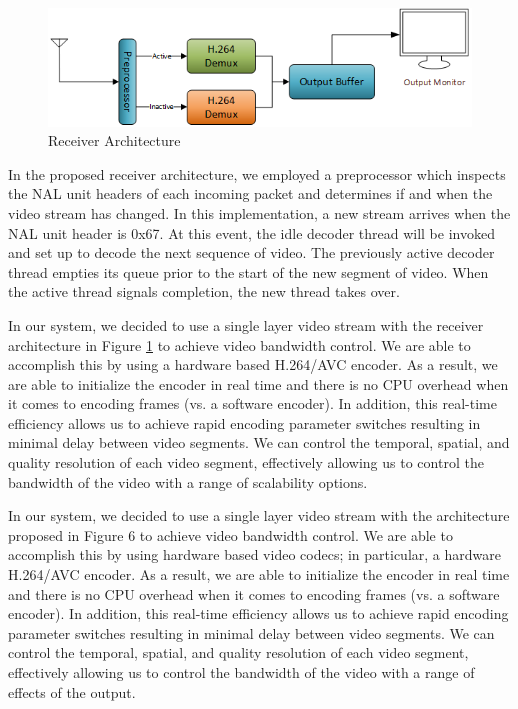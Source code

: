 \documentclass[a4paper,12pt]{article}
\begin{document}
\begin{figure}[h]
\centering
\includegraphics[width=0.8\linewidth]{ReceiverArchitecture.png}
\caption{Receiver Architecture}
\label{fig:ReceiverArchitecture}
\end{figure}
In the proposed receiver architecture, we employed a preprocessor which inspects the NAL unit headers of each incoming packet and determines if and when the video stream has changed. In this implementation, a new stream arrives when the NAL unit header is 0x67. At this event, the idle decoder thread will be invoked and set up to decode the next sequence of video. The previously active decoder thread empties its queue prior to the start of the new segment of video. When the active thread signals completion, the new thread takes over.

In our system, we decided to use a single layer video stream with the receiver architecture in Figure \ref{fig:ReceiverArchitecture} to achieve video bandwidth control. We are able to accomplish this by using a hardware based H.264/AVC encoder. As a result, we are able to initialize the encoder in real time and there is no CPU overhead when it comes to encoding frames (vs. a software encoder). In addition, this real-time efficiency allows us to achieve rapid encoding parameter switches resulting in minimal delay between video segments. We can control the temporal, spatial, and quality resolution of each video segment, effectively allowing us to control the bandwidth of the video with a range of scalability options. 

In our system, we decided to use a single layer video stream with the architecture proposed in Figure 6 to achieve video bandwidth control. We are able to accomplish this by using hardware based video codecs; in particular, a hardware H.264/AVC encoder. As a result, we are able to initialize the encoder in real time and there is no CPU overhead when it comes to encoding frames (vs. a software encoder). In addition, this real-time efficiency allows us to achieve rapid encoding parameter switches resulting in minimal delay between video segments. We can control the temporal, spatial, and quality resolution of each video segment, effectively allowing us to control the bandwidth of the video with a range of effects of the output.
\end{document}
